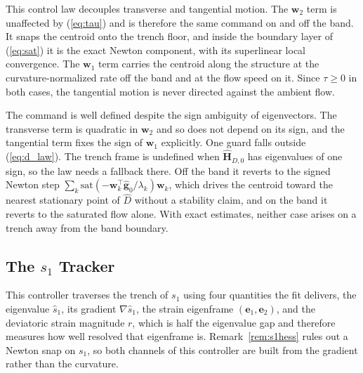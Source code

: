 \documentclass[lettersize,journal]{IEEEtran}
\begin{document}
This control law decouples transverse and tangential motion. The
$\mathbf{w}_2$ term is unaffected by (\ref{eq:tau}) and is therefore the
same command on and off the band. It snaps the centroid onto the trench
floor, and inside the boundary layer of (\ref{eq:sat}) it is the exact
Newton component, with its superlinear local convergence. The
$\mathbf{w}_1$ term carries the centroid along the structure at the
curvature-normalized rate off the band and at the flow speed on it.
Since $\tau \geq 0$ in both cases, the tangential motion is never
directed against the ambient flow.

The command is well defined despite the sign ambiguity of eigenvectors.
The transverse term is quadratic in $\mathbf{w}_2$ and so does not
depend on its sign, and the tangential term fixes the sign of
$\mathbf{w}_1$ explicitly. One guard falls outside (\ref{eq:d_law}).
The trench frame is undefined when $\hat{\mathbf{H}}_{D,0}$ has
eigenvalues of one sign, so the law needs a fallback there. Off the
band it reverts to the signed Newton step $\sum_k
\mathrm{sat}(-\mathbf{w}_k^\top\hat{\mathbf{g}}_0/\lambda_k)\mathbf{w}_k$,
which drives the centroid toward the nearest stationary point of
$\hat{D}$ without a stability claim, and on the band it reverts to the
saturated flow alone. With exact estimates, neither case arises on a
trench away from the band boundary.




\subsection{The $s_1$ Tracker}
\label{sec:oecs_controller}


This controller traverses the trench of $s_1$ using four quantities the
fit delivers, the eigenvalue $\hat{s}_1$, its gradient
$\nabla\hat{s}_1$, the strain eigenframe $(\mathbf{e}_1, \mathbf{e}_2)$,
and the deviatoric strain magnitude $r$, which is half the eigenvalue gap
and therefore measures how well resolved that eigenframe is.
Remark~\ref{rem:s1hess} rules out a Newton snap on $s_1$, so both
channels of this controller are built from the gradient rather than the
curvature.
\end{document}
